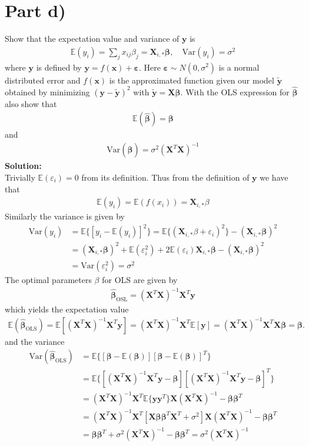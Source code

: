 \documentclass[%
reprint,
amsmath,amssymb,
aps,
]{revtex4-2}
\begin{document}
\section*{Part d)}
Show that the expectation value and variance of $\bm y$ is
\begin{align*}
	\mathbb{E}(y_i)=\sum_{j}x_{ij}\beta_j=\bm X_{i,*}\bm\beta,\quad 
	\text{Var}(y_i)=\sigma^2
\end{align*}
where $\bm y$ is defined by $\bm y=f(\bm x)+\bm \varepsilon$. Here $\bm \varepsilon\sim N(0,\sigma^2)$ is a normal distributed error and $f(\bm x)$ is the approximated function given our model $\tilde{\bm y}$ obtained by minimizing $(\bm y-\tilde{\bm y})^2$ with $\tilde{\bm y}=\bm X\bm \beta$. With the OLS expression for $\hat{\bm \beta}$ also show that 
\begin{align*}
	\mathbb{E}(\hat{\bm \beta})=\bm\beta
\end{align*}
and
\begin{align*}
	\text{Var}(\hat{\bm \beta})=\sigma^2(\bm X^T\bm X)^{-1}
\end{align*}
\textbf{Solution:} \\
Trivially $\mathbb{E}(\varepsilon_i)=0$ from its definition. Thus from the definition of $\bm y$ we have that
\begin{align*}
	\mathbb{E}(y_i)=\mathbb{E}(f(x_i))=\bm X_{i,*}\beta
\end{align*}
Similarly the variance is given by
\begin{align*}
	\text{Var}(y_i)&=\mathbb{E}\{[y_i-\mathbb{E}(y_i)]^2\}=\mathbb{E}\{(\bm X_{i,*}\beta+\varepsilon_i)^2\}-(\bm X_{i,*}\bm\beta)^2\\
	&=(\bm X_{i,*}\bm\beta)^2+\mathbb{E}(\varepsilon_i^2)+2\mathbb{E}(\varepsilon_i)\bm X_{i,*}\bm\beta-(\bm X_{i,*}\bm\beta)^2\\
	&=\text{Var}(\varepsilon_i^2)=\sigma^2
\end{align*}
The optimal parameters $\beta$ for OLS are given by
\begin{align*}
	\hat{\bm \beta}_\text{OSL}=(\bm X^T\bm X)^{-1}\bm X^T\bm y
\end{align*}
which yields the expectation value
\begin{align*}
	\mathbb{E}(\hat{\bm\beta}_\text{OLS})=\mathbb{E}[ (\bm X^T\bm X)^{-1}\bm X^T\bm y]=(\bm X^T\bm X)^{-1}\bm X^T \mathbb{E}[\bm y]=(\bm X^T\bm X)^{-1}\bm X^T\bm X\bm\beta=\bm\beta.
\end{align*}
and the variance
\begin{align*}
	\text{Var}(\hat{\bm\beta}_\text{OLS})&=\mathbb E\{ [\bm\beta-\mathbb E(\bm\beta)] [\bm\beta-\mathbb E(\bm\beta)]^T\}\\
	&=\mathbb E\{ [(\bm X^T\bm X)^{-1}\bm X^T\bm y-\bm\beta][(\bm X^T\bm X)^{-1}\bm X^T\bm y-\bm\beta]^T\}\\
	&=(\bm X^T\bm X)^{-1}\bm X^T\mathbb E\{\bm y\bm y^T\}\bm X(\bm X^T\bm X)^{-1}-\bm\beta\bm\beta^T\\
	&=(\bm X^T\bm X)^{-1}\bm X^T[\bm X\bm\beta\bm\beta^T\bm X^T+\sigma^2]\bm X(\bm X^T\bm X)^{-1}-\bm\beta\bm\beta^T\\
	&=\bm\beta\bm\beta^T+\sigma^2(\bm X^T\bm X)^{-1}-\bm\beta\bm\beta^T=\sigma^2(\bm X^T \bm X)^{-1}
\end{align*}
\end{document}
